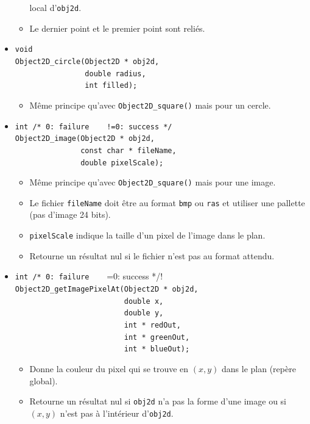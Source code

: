 \documentclass[12pt]{article}
\begin{document}
\begin{itemize}
\begin{itemize}
            local d'\verb!obj2d!.
      \item Le dernier point et le premier point sont reli\'es.
      \end{itemize}
\item \verb!void! \\
      \verb!Object2D_circle(Object2D * obj2d,! \\
      \verb!                double radius,! \\
      \verb!                int filled);!
      \begin{itemize}
      \item M\^eme principe qu'avec \verb!Object2D_square()! mais pour
            un cercle.
      \end{itemize}
\item \verb|int /* 0: failure    !=0: success */| \\
      \verb!Object2D_image(Object2D * obj2d,! \\
      \verb!               const char * fileName,! \\
      \verb!               double pixelScale);!
      \begin{itemize}
      \item M\^eme principe qu'avec \verb!Object2D_square()! mais pour
            une image.
      \item Le fichier \verb!fileName! doit \^etre au format \verb!bmp!
            ou \verb!ras! et utiliser une pallette (pas d'image 24 bits).
      \item \verb!pixelScale! indique la taille d'un pixel de l'image
            dans le plan.
      \item Retourne un r\'esultat nul si le fichier n'est pas au format
            attendu.
      \end{itemize}
\item \verb!int /* 0: failure    !=0: success */! \\
      \verb!Object2D_getImagePixelAt(Object2D * obj2d,! \\
      \verb!                         double x,! \\
      \verb!                         double y,! \\
      \verb!                         int * redOut,! \\
      \verb!                         int * greenOut,! \\
      \verb!                         int * blueOut);!
      \begin{itemize}
      \item Donne la couleur du pixel qui se trouve en $(x,y)$ dans le plan
            (rep\`ere global).
      \item Retourne un r\'esultat nul si \verb!obj2d! n'a pas la forme d'une
            image ou si $(x,y)$ n'est pas \`a l'int\'erieur d'\verb!obj2d!.
      \end{itemize}
\end{itemize}
\end{document}
